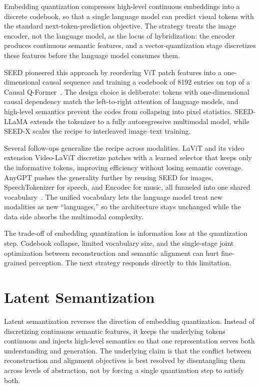 \documentclass[manuscript,screen,review]{acmart}
\begin{document}
Embedding quantization compresses high-level continuous embeddings into
a discrete codebook, so that a single language model can predict visual
tokens with the standard next-token-prediction objective. The strategy
treats the image encoder, not the language model, as the locus of
hybridization: the encoder produces continuous semantic features, and
a vector-quantization stage discretizes these features before the
language model consumes them.

SEED pioneered this approach by reordering ViT patch features into a
one-dimensional causal sequence and training a codebook of 8192 entries
on top of a Causal Q-Former~\cite{ge2023seed}. The design choice is
deliberate: tokens with one-dimensional causal dependency match the
left-to-right attention of language models, and high-level semantics
prevent the codes from collapsing into pixel statistics. SEED-LLaMA
extends the tokenizer to a fully autoregressive multimodal model, while
SEED-X scales the recipe to interleaved image--text training.

Several follow-ups generalize the recipe across modalities. LaViT and
its video extension Video-LaViT discretize patches with a learned
selector that keeps only the informative tokens, improving efficiency
without losing semantic coverage. AnyGPT pushes the generality further
by reusing SEED for images, SpeechTokenizer for speech, and Encodec for
music, all funneled into one shared vocabulary~\cite{zhan2024anygpt}.
The unified vocabulary lets the language model treat new modalities as
new ``languages,'' so the architecture stays unchanged while the data
side absorbs the multimodal complexity.

The trade-off of embedding quantization is information loss at the
quantization step. Codebook collapse, limited vocabulary size, and the
single-stage joint optimization between reconstruction and semantic
alignment can hurt fine-grained perception. The next strategy responds
directly to this limitation.

\section{Latent Semantization}

Latent semantization reverses the direction of embedding quantization.
Instead of discretizing continuous semantic features, it keeps the
underlying tokens continuous and injects high-level semantics so that
one representation serves both understanding and generation. The
underlying claim is that the conflict between reconstruction and
alignment objectives is best resolved by disentangling them across
levels of abstraction, not by forcing a single quantization step to
satisfy both.
\end{document}
